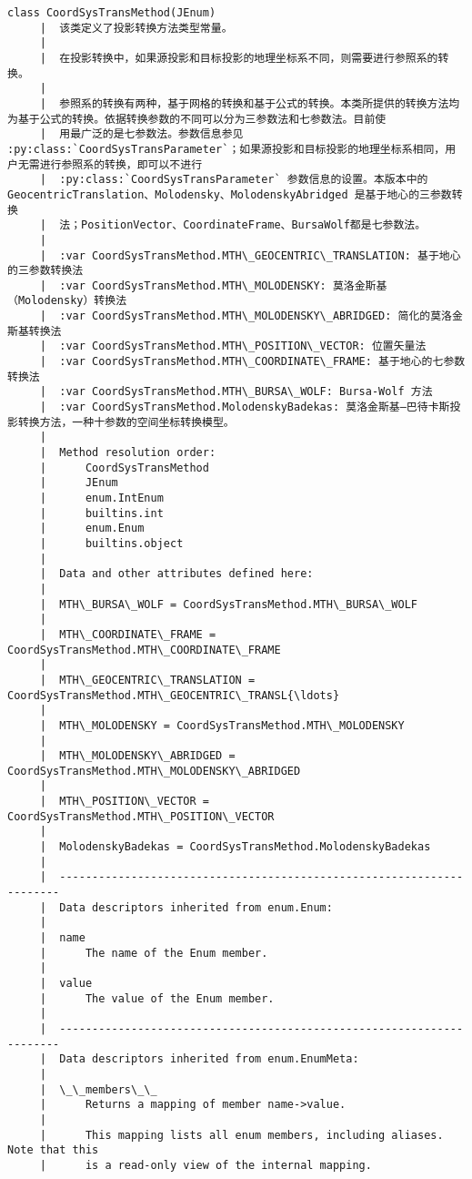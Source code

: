 \documentclass[11pt]{article}
\begin{document}
\begin{Verbatim}[commandchars=\\\{\}]
    class CoordSysTransMethod(JEnum)
     |  该类定义了投影转换方法类型常量。
     |  
     |  在投影转换中，如果源投影和目标投影的地理坐标系不同，则需要进行参照系的转换。
     |  
     |  参照系的转换有两种，基于网格的转换和基于公式的转换。本类所提供的转换方法均为基于公式的转换。依据转换参数的不同可以分为三参数法和七参数法。目前使
     |  用最广泛的是七参数法。参数信息参见 :py:class:`CoordSysTransParameter`；如果源投影和目标投影的地理坐标系相同，用户无需进行参照系的转换，即可以不进行
     |  :py:class:`CoordSysTransParameter` 参数信息的设置。本版本中的 GeocentricTranslation、Molodensky、MolodenskyAbridged 是基于地心的三参数转换
     |  法；PositionVector、CoordinateFrame、BursaWolf都是七参数法。
     |  
     |  :var CoordSysTransMethod.MTH\_GEOCENTRIC\_TRANSLATION: 基于地心的三参数转换法
     |  :var CoordSysTransMethod.MTH\_MOLODENSKY: 莫洛金斯基（Molodensky）转换法
     |  :var CoordSysTransMethod.MTH\_MOLODENSKY\_ABRIDGED: 简化的莫洛金斯基转换法
     |  :var CoordSysTransMethod.MTH\_POSITION\_VECTOR: 位置矢量法
     |  :var CoordSysTransMethod.MTH\_COORDINATE\_FRAME: 基于地心的七参数转换法
     |  :var CoordSysTransMethod.MTH\_BURSA\_WOLF: Bursa-Wolf 方法
     |  :var CoordSysTransMethod.MolodenskyBadekas: 莫洛金斯基—巴待卡斯投影转换方法，一种十参数的空间坐标转换模型。
     |  
     |  Method resolution order:
     |      CoordSysTransMethod
     |      JEnum
     |      enum.IntEnum
     |      builtins.int
     |      enum.Enum
     |      builtins.object
     |  
     |  Data and other attributes defined here:
     |  
     |  MTH\_BURSA\_WOLF = CoordSysTransMethod.MTH\_BURSA\_WOLF
     |  
     |  MTH\_COORDINATE\_FRAME = CoordSysTransMethod.MTH\_COORDINATE\_FRAME
     |  
     |  MTH\_GEOCENTRIC\_TRANSLATION = CoordSysTransMethod.MTH\_GEOCENTRIC\_TRANSL{\ldots}
     |  
     |  MTH\_MOLODENSKY = CoordSysTransMethod.MTH\_MOLODENSKY
     |  
     |  MTH\_MOLODENSKY\_ABRIDGED = CoordSysTransMethod.MTH\_MOLODENSKY\_ABRIDGED
     |  
     |  MTH\_POSITION\_VECTOR = CoordSysTransMethod.MTH\_POSITION\_VECTOR
     |  
     |  MolodenskyBadekas = CoordSysTransMethod.MolodenskyBadekas
     |  
     |  ----------------------------------------------------------------------
     |  Data descriptors inherited from enum.Enum:
     |  
     |  name
     |      The name of the Enum member.
     |  
     |  value
     |      The value of the Enum member.
     |  
     |  ----------------------------------------------------------------------
     |  Data descriptors inherited from enum.EnumMeta:
     |  
     |  \_\_members\_\_
     |      Returns a mapping of member name->value.
     |      
     |      This mapping lists all enum members, including aliases. Note that this
     |      is a read-only view of the internal mapping.
    

\end{Verbatim}
\end{document}
